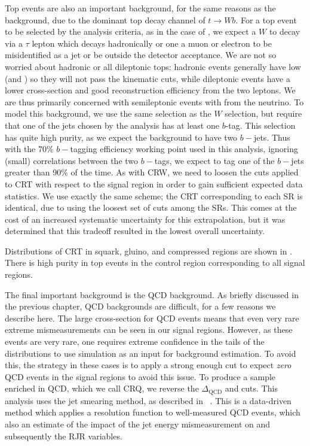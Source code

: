 Top events are also an important background, for the same reasons as the \wjets~ background, due to the dominant top decay channel of $t \rightarrow Wb$.
For a top event to be selected by the analysis criteria, as in the case of \wjets, we expect a $W$ to decay via a $\tau$ lepton which decays hadronically or one a muon or electron to be misidentified as a jet or be outside the detector acceptance.
We are not so worried about hadronic or all dileptonic tops: hadronic \ttbar events generally have low \met (and ) so they will not pass the kinematic cuts, while dileptonic \ttbar events have a lower cross-section and good reconstruction efficiency from the two leptons.
We are thus primarily concerned with semileptonic \ttbar events with \met from the neutrino.
To model this background, we use the same selection as the $W$ selection, but require that one of the jets chosen by the analysis has at least one $b$-tag.
This selection has quite high purity, as we expect the \ttbar background to have two $b-$jets.
Thus with the 70\% $b-$tagging efficiency working point used in this analysis, ignoring (small) correlations between the two $b-$tags, we expect to tag one of the $b-$jets greater than 90\% of the time.
As with CRW, we need to loosen the cuts applied to CRT with respect to the signal region in order to gain sufficient expected data statistics.
We use exactly the same scheme; the CRT corresponding to each SR is identical, due to using the loosest set of cuts among the SRs.
This comes at the cost of an increased systematic uncertainty for this extrapolation, but it was determined that this tradeoff resulted in the lowest overall uncertainty.

Distributions of CRT in squark, gluino, and compressed regions are shown in .
There is high purity in top events in the control region corresponding to all signal regions.

The final important background is the QCD background.
As briefly discussed in the previous chapter, QCD backgrounds are difficult, for a few reasons we describe here.
The large cross-section for QCD events means that even very rare extreme mismeasurements can be seen in our signal regions.
However, as these events are very rare, one requires extreme confidence in the tails of the distributions to use simulation as an input for background estimation.
To avoid this, the strategy in these cases is to apply a strong enough cut to expect \textit{zero} QCD events in the signal regions to avoid this issue.
To produce a sample enriched in QCD, which we call CRQ, we reverse the $\Delta_{\mathrm{QCD}}$ and  cuts.
This analysis uses the jet smearing method, as described in ~\cite{SUSY-2011-20}.
This is a data-driven method which applies a resolution function to well-measured QCD events, which also an estimate of the impact of the jet energy mismeasurement on \met and subsequently the RJR variables.

